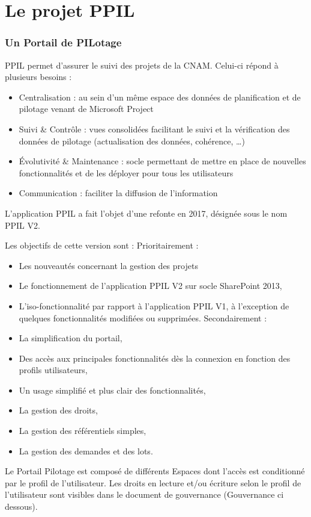 \section{Le projet PPIL}
\subsubsection{Un Portail de PILotage}
PPIL permet d'assurer le suivi des projets de la CNAM.
Celui-ci répond à plusieurs besoins :
\begin{itemize}
    \item Centralisation : au sein d’un même espace des données de planification et de pilotage venant de Microsoft Project
    \item Suivi & Contrôle : vues consolidées facilitant le suivi et la vérification des données de pilotage (actualisation des données, cohérence, …)
    \item Évolutivité & Maintenance : socle permettant de mettre en place de nouvelles fonctionnalités et de les déployer pour tous les utilisateurs
    \item Communication : faciliter la diffusion de l’information
\end{itemize}
L'application PPIL a fait l'objet d'une refonte en 2017, désignée sous le nom PPIL V2. 

Les objectifs de cette version sont :
Prioritairement :
\begin{itemize}
    \item Les nouveautés concernant la gestion des projets
    \item Le fonctionnement de l’application PPIL V2 sur socle SharePoint 2013,
    \item L’iso-fonctionnalité par rapport à l’application PPIL V1, à l’exception de quelques fonctionnalités modifiées ou supprimées.
Secondairement :
    \item La simplification du portail,
    \item Des accès aux principales fonctionnalités dès la connexion en fonction des profils utilisateurs,
    \item Un usage simplifié et plus clair des fonctionnalités,
    \item La gestion des droits,
    \item La gestion des référentiels simples,
    \item La gestion des demandes et des lots.
\end{itemize}

Le Portail Pilotage est composé de différents Espaces dont l’accès est conditionné par le profil de l’utilisateur.
Les droits en lecture et/ou écriture selon le profil de l’utilisateur sont visibles dans le document de gouvernance (Gouvernance ci dessous).

